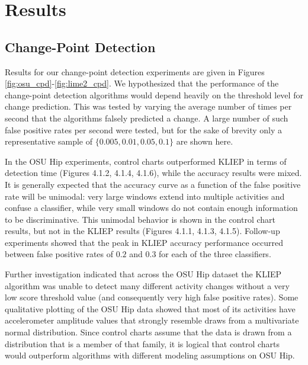 \chapter{Results}
%

\section{Change-Point Detection}
Results for our change-point detection experiments are given in
Figures \ref{fig:osu_cpd}-\ref{fig:lime2_cpd}.
We hypothesized that the performance of the change-point detection algorithms
would depend heavily on the threshold level for change prediction. This was
tested by varying the average number of times per second that the algorithms
falsely predicted a change. A large number of such false positive rates per
second were tested, but for the sake of brevity only a representative sample
of $\{0.005, 0.01, 0.05, 0.1\}$ are shown here.

In the OSU Hip experiments, control charts outperformed KLIEP in terms of
detection time (Figures 4.1.2, 4.1.4, 4.1.6), while the accuracy results were
mixed. It is generally expected that the accuracy curve as
a function of the false positive rate will be unimodal: very large windows
extend into multiple activities and confuse a classifier, while very small
windows do not contain enough information to be discriminative. This
unimodal behavior is shown in the control chart results, but not in the KLIEP
results (Figures 4.1.1, 4.1.3, 4.1.5). Follow-up experiments showed that the peak
in KLIEP accuracy performance occurred between false positive rates of $0.2$ and
$0.3$ for each of the three classifiers.

Further investigation indicated that across the OSU Hip dataset the KLIEP algorithm
was unable to detect many different activity changes without a very low score
threshold value (and consequently very high false positive rates).
Some qualitative plotting of the OSU Hip data showed
that most of its activities have accelerometer amplitude values that strongly
resemble draws from a multivariate normal distribution. Since control charts
assume that the data is drawn from a distribution that is a member of that
family, it is logical that control charts would outperform algorithms with
different modeling assumptions on OSU Hip.

